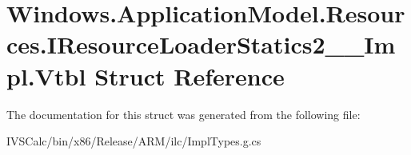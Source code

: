 \hypertarget{struct_windows_1_1_application_model_1_1_resources_1_1_i_resource_loader_statics2_____impl_1_1_vtbl}{}\section{Windows.\+Application\+Model.\+Resources.\+I\+Resource\+Loader\+Statics2\+\_\+\+\_\+\+Impl.\+Vtbl Struct Reference}
\label{struct_windows_1_1_application_model_1_1_resources_1_1_i_resource_loader_statics2_____impl_1_1_vtbl}


The documentation for this struct was generated from the following file\+:\begin{DoxyCompactItemize}
\item 
I\+V\+S\+Calc/bin/x86/\+Release/\+A\+R\+M/ilc/Impl\+Types.\+g.\+cs\end{DoxyCompactItemize}
